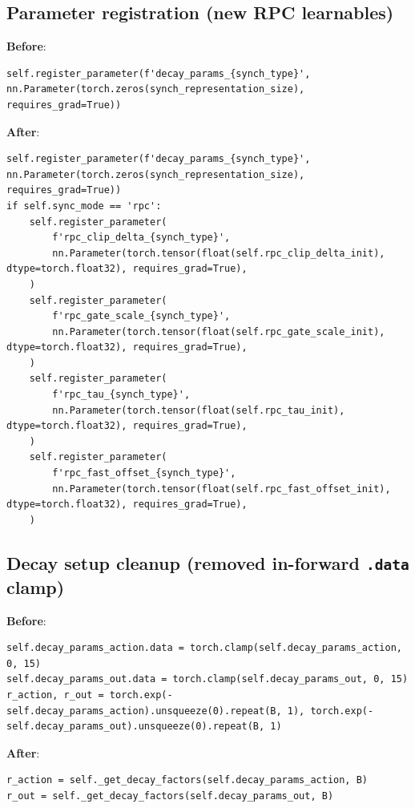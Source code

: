 \documentclass[11pt]{article}
\begin{document}
\subsection{Parameter registration (new RPC learnables)}
\textbf{Before}:
\begin{lstlisting}[style=pycode]
self.register_parameter(f'decay_params_{synch_type}', nn.Parameter(torch.zeros(synch_representation_size), requires_grad=True))
\end{lstlisting}

\textbf{After}:
\begin{lstlisting}[style=pycode]
self.register_parameter(f'decay_params_{synch_type}', nn.Parameter(torch.zeros(synch_representation_size), requires_grad=True))
if self.sync_mode == 'rpc':
    self.register_parameter(
        f'rpc_clip_delta_{synch_type}',
        nn.Parameter(torch.tensor(float(self.rpc_clip_delta_init), dtype=torch.float32), requires_grad=True),
    )
    self.register_parameter(
        f'rpc_gate_scale_{synch_type}',
        nn.Parameter(torch.tensor(float(self.rpc_gate_scale_init), dtype=torch.float32), requires_grad=True),
    )
    self.register_parameter(
        f'rpc_tau_{synch_type}',
        nn.Parameter(torch.tensor(float(self.rpc_tau_init), dtype=torch.float32), requires_grad=True),
    )
    self.register_parameter(
        f'rpc_fast_offset_{synch_type}',
        nn.Parameter(torch.tensor(float(self.rpc_fast_offset_init), dtype=torch.float32), requires_grad=True),
    )
\end{lstlisting}

\subsection{Decay setup cleanup (removed in-forward \texttt{.data} clamp)}
\textbf{Before}:
\begin{lstlisting}[style=pycode]
self.decay_params_action.data = torch.clamp(self.decay_params_action, 0, 15)
self.decay_params_out.data = torch.clamp(self.decay_params_out, 0, 15)
r_action, r_out = torch.exp(-self.decay_params_action).unsqueeze(0).repeat(B, 1), torch.exp(-self.decay_params_out).unsqueeze(0).repeat(B, 1)
\end{lstlisting}

\textbf{After}:
\begin{lstlisting}[style=pycode]
r_action = self._get_decay_factors(self.decay_params_action, B)
r_out = self._get_decay_factors(self.decay_params_out, B)
\end{lstlisting}
\end{document}
